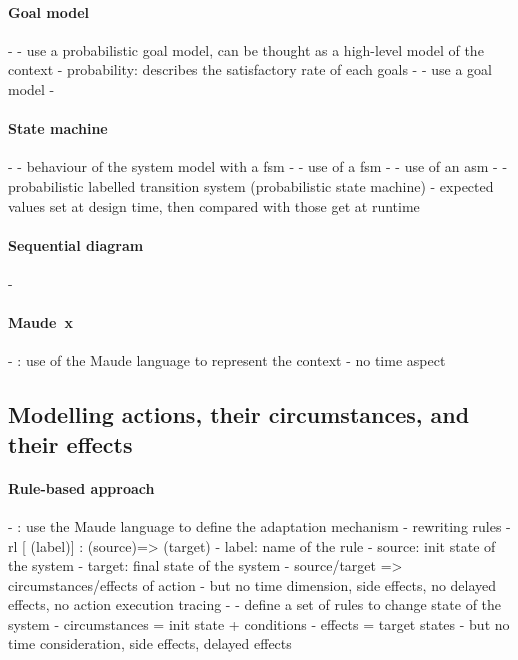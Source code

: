 \paragraph{Goal model} %
- \cite{DBLP:conf/icse/CailliauL17}
	- use a probabilistic goal model, can be thought as a high-level model of the context
		- probability: describes the satisfactory rate of each goals
- \cite{DBLP:conf/icse/IftikharW14a}
	- use a goal model
- \cite{DBLP:conf/icse/MendoncaAR14}

\paragraph{State machine} %
- \cite{DBLP:conf/smartgridsec/0001FKNT14}
	- behaviour of the system model with a \gls{fsm}
- \cite{DBLP:conf/icse/IftikharW14a}
	- use of a \gls{fsm}
- \cite{DBLP:conf/icse/ArcainiRS15}
	- use of an \gls{asm}
- \cite{DBLP:conf/icse/BarbosaLMJ17}
	- probabilistic labelled transition system (probabilistic state machine) 
		- expected values set at design time, then compared with those get at runtime

\paragraph{Sequential diagram}
- \cite{DBLP:conf/icse/TaharaOH17}

\paragraph{Maude~\cite{DBLP:journals/tcs/ClavelDELMMQ02}x}
- \cite{DBLP:conf/icse/TaharaOH17}: use of the Maude language  to represent the context
	- no time aspect
	
	
	
	
	
	
	
	
	
\subsection[Modelling actions, their circumstances, and their effects]{Modelling \glspl{action}, their \glspl{circumstance}, and their effects}

\paragraph{Rule-based approach}
- \cite{DBLP:conf/icse/TaharaOH17}: use the Maude language to define the adaptation mechanism
	- rewriting rules
	- rl [ (label)] : (source)=> (target)
		- label: name of the rule
		- source: init state of the system
		- target: final state of the system
	- source/target => circumstances/effects of action
	 - but no time dimension, side effects, no delayed effects, no action execution tracing
- \cite{DBLP:conf/icse/ArcainiRS15}
	- define a set of rules to change state of the system
	- circumstances = init state + conditions
	- effects = target states
		- but no time consideration, side effects, delayed effects
		
